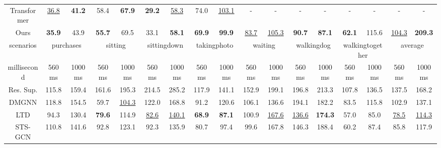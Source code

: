 \begin{table}[h]
{\begin{tabular}{c|cc|cc|cc|cc|cc|cc|cc|cc}
Transformer & \underline{36.8}          & \textbf{41.2}  & 58.4          & \textbf{67.9}  & \textbf{29.2}           & \underline{58.3}           & 74.0            & \underline{103.1}         & -             & -              & -              & -              & -                & -                & -              & -              \\
Ours   & \textbf{35.9} & 43.9           & \textbf{55.7} & 69.5           & 33.1           & \textbf{58.1}  & \textbf{69.9}   & \textbf{99.9} & \underline{83.7}          & \underline{105.3}          & \textbf{90.7}  & \textbf{87.1}  & \textbf{62.1}    & 115.6            & \underline{104.3}          & \textbf{209.3} \\ \hline
scenarios   & \multicolumn{2}{c|}{purchases}  & \multicolumn{2}{c|}{sitting}    & \multicolumn{2}{c|}{sittingdown} & \multicolumn{2}{c|}{takingphoto} & \multicolumn{2}{c|}{waiting}    & \multicolumn{2}{c|}{walkingdog}  & \multicolumn{2}{c|}{walkingtogether} & \multicolumn{2}{c}{average}         \\ \hline
millisecond & 560ms         & 1000ms         & 560ms         & 1000ms         & 560ms          & 1000ms         & 560ms           & 1000ms        & 560ms         & 1000ms         & 560ms          & 1000ms         & 560ms            & 1000ms           & 560ms          & 1000ms         \\ \hline
Res. Sup.   & 115.8        & 159.4         & 161.6       & 195.3        & 214.5        & 285.2         & 117.9         & 141.1       & 152.9       & 199.1        & 196.8        & 213.3        & 107.8          & 136.5          & 137.5          & 168.2          \\
DMGNN       & 118.8         & 154.5          & 59.7          & \underline{104.3}          & 122.0          & 168.8          & 91.2            & 120.6         & 106.1         & 136.6          & 194.1          & 182.2          & 83.5             & 115.8            & 102.9          & 137.1          \\
LTD   & 94.3          & 130.4          & \textbf{79.6}          & 114.9          & \underline{82.6}           & \underline{140.1}          & \textbf{68.9}            & \textbf{87.1}          & 100.9         & \underline{167.6}          & \underline{136.6}          & \textbf{174.3} & 57.0             & 85.0             & \underline{78.5}           & \underline{114.3}          \\
STS-GCN              & 110.8                & 141.6                & 92.8                 & 123.1                & 92.3                 & 135.9                & 80.7                 & 97.4                 & 99.6                 & 167.8                & 146.3                & 188.4                & 60.2                 & 87.4                 & 85.8                 & 117.9\\

\end{tabular}}
\end{table}
